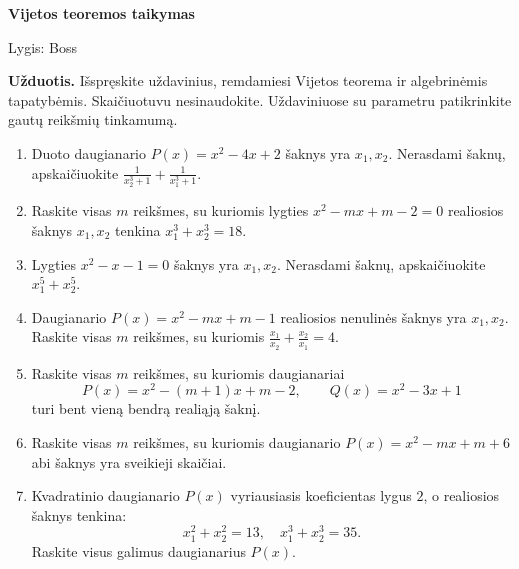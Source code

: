 \documentclass[11pt,a4paper]{article}
\begin{document}
\begin{center}
{\Large\bfseries Vijetos teoremos taikymas}

\medskip
{\large Lygis: Boss}

\end{center}
\textbf{Užduotis.} Išspręskite uždavinius, remdamiesi Vijetos teorema
ir algebrinėmis tapatybėmis. Skaičiuotuvu nesinaudokite.
Uždaviniuose su parametru patikrinkite gautų reikšmių tinkamumą.
\medskip
\begin{enumerate}
\item \begin{minipage}[t]{\linewidth}Duoto daugianario \(P(x)=x^{2}-4x+2\) šaknys yra \(x_1,x_2\). Nerasdami šaknų, apskaičiuokite \mbox{\(\frac{1}{x_{2}^{3} + 1} + \frac{1}{x_{1}^{3} + 1}\)}.\end{minipage}
\item \begin{minipage}[t]{\linewidth}Raskite visas \(m\) reikšmes, su kuriomis lygties \(x^{2}-mx+m - 2=0\) realiosios šaknys \(x_1,x_2\) tenkina \mbox{\(x_1^3+x_2^3=18\)}.\end{minipage}
\item \begin{minipage}[t]{\linewidth}Lygties \(x^{2}-x-1=0\) šaknys yra \(x_1,x_2\). Nerasdami šaknų, apskaičiuokite \mbox{\(x_{1}^{5} + x_{2}^{5}\)}.\end{minipage}
\item \begin{minipage}[t]{\linewidth}Daugianario \(P(x)=x^{2}-mx+m - 1\) realiosios nenulinės šaknys yra \(x_1,x_2\). Raskite visas \(m\) reikšmes, su kuriomis \mbox{\(\frac{x_1}{x_2}+\frac{x_2}{x_1}=4\)}.\end{minipage}
\item \begin{minipage}[t]{\linewidth}Raskite visas \(m\) reikšmes, su kuriomis daugianariai \[P(x)=x^{2}-\left(m + 1\right)x+m - 2,\qquad Q(x)=x^{2}-3x+1\] turi bent vieną bendrą realiąją šaknį.\end{minipage}
\item \begin{minipage}[t]{\linewidth}Raskite visas \(m\) reikšmes, su kuriomis daugianario \(P(x)=x^{2}-mx+m + 6\) abi šaknys yra sveikieji skaičiai.\end{minipage}
\item \begin{minipage}[t]{\linewidth}Kvadratinio daugianario \(P(x)\) vyriausiasis koeficientas lygus \(2\), o realiosios šaknys tenkina: \[x_1^2+x_2^2=13,\quad x_1^3+x_2^3=35.\] Raskite visus galimus daugianarius \(P(x)\).\end{minipage}

\end{enumerate}
\end{document}

